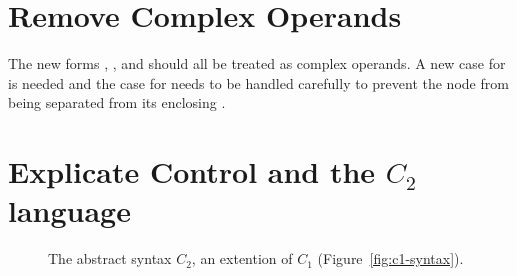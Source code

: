\documentclass[11pt]{book}
\newcommand{\gray}[1]{{\color{gray} #1}}
\begin{document}
\section{Remove Complex Operands}
\label{sec:remove-complex-opera-R2}

The new forms , , and 
should all be treated as complex operands. A new case for
 is needed and the case for  needs to be
handled carefully to prevent the  node from being separated
from its enclosing .


\section{Explicate Control and the $C_2$ language}
\label{sec:explicate-control-r3}

\begin{figure}[tp]
\fbox{
  \begin{minipage}{0.96\textwidth}
    \small
\[
\begin{array}{lcl}
\Atm &::=& \gray{ \INT{\Int} \mid \VAR{\Var} \mid \BOOL{\itm{bool}} }\\
\itm{cmp} &::= & \gray{  \key{eq?} \mid \key{<} } \\
\Exp &::= & \gray{ \Atm \mid \READ{} } \\
   &\mid& \gray{ \NEG{\Atm} \mid \ADD{\Atm}{\Atm} }\\
   &\mid& \gray{ \UNIOP{\key{not}}{\Atm} \mid \BINOP{\itm{cmp}}{\Atm}{\Atm}  } \\
   &\mid& (\key{Allocate} \,\itm{int}\,\itm{type}) \\
   &\mid& \BINOP{\key{'vector-ref}}{\Atm}{\Int}  \\
   &\mid& (\key{Prim}~\key{'vector-set!}\,(\key{list}\,\Atm\,\Int\,\Atm))\\
   &\mid& (\key{GlobalValue} \,\itm{name}) \mid (\key{Void})\\
\Stmt &::=& \gray{ \ASSIGN{\VAR{\Var}}{\Exp} } 
       \mid (\key{Collect} \,\itm{int}) \\
\Tail &::= & \gray{ \RETURN{\Exp} \mid \SEQ{\Stmt}{\Tail} 
       \mid \GOTO{\itm{label}} } \\
      &\mid& \gray{ \IFSTMT{\BINOP{\itm{cmp}}{\Atm}{\Atm}}{\GOTO{\itm{label}}}{\GOTO{\itm{label}}}  }\\
C_2 & ::= & \PROGRAM{\itm{info}}{\CFG{(\itm{label}\,\key{.}\,\Tail)^{+}}}
\end{array}
\]
\end{minipage}
}
\caption{The abstract syntax $C_2$, an extention of $C_1$
  (Figure~\ref{fig:c1-syntax}).}
\label{fig:c2-syntax}
\end{figure}
\end{document}
